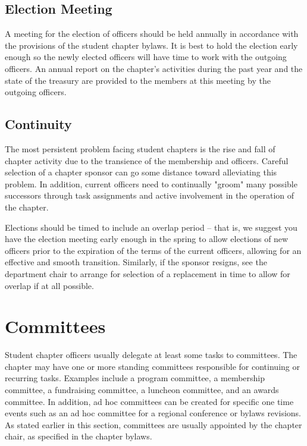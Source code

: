 \subsection*{Election Meeting}
A meeting for the election of officers should be held annually in accordance
with the provisions of the student chapter bylaws. It is best to hold the
election early enough so the newly elected officers will have time to work with
the outgoing officers. An annual report on the chapter's activities during the
past year and the state of the treasury are provided to the members at this
meeting by the outgoing officers.

\subsection*{Continuity}
The most persistent problem facing student chapters is the rise and fall of
chapter activity due to the transience of the membership and officers. Careful
selection of a chapter sponsor can go some distance toward alleviating this
problem. In addition, current officers need to continually "groom" many possible
successors through task assignments and active involvement in the operation of
the chapter.

Elections should be timed to include an overlap period -- that is, we suggest
you have the election meeting early enough in the spring to allow elections of
new officers prior to the expiration of the terms of the current officers,
allowing for an effective and smooth transition. Similarly, if the sponsor
resigns, see the department chair to arrange for selection of a replacement in
time to allow for overlap if at all possible.

\section{Committees}
\label{sec:committees}

Student chapter officers usually delegate at least some tasks to committees. The
chapter may have one or more standing committees responsible for continuing or
recurring tasks. Examples include a program committee, a membership committee, a
fundraising committee, a luncheon committee, and an awards committee. In
addition, ad hoc committees can be created for specific one time events such as
an ad hoc committee for a regional conference or bylaws revisions. As stated
earlier in this section, committees are usually appointed by the chapter chair,
as specified in the chapter bylaws.

